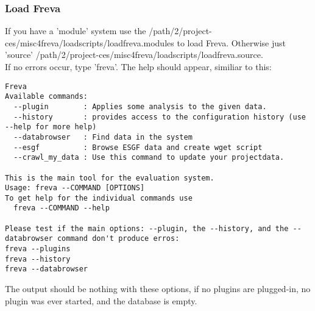 \documentclass[a4paper,11pt]{ltxdoc}
\begin{document}
\subsubsection{Load Freva}
If you have a 'module' system use the /path/2/project-ces/misc4freva/loadscripts/loadfreva.modules to load Freva. Otherwise just 'source' /path/2/project-ces/misc4freva/loadscripts/loadfreva.source. \\
If no errors occur, type 'freva'. The help should appear, similiar to this:
\begin{verbatim}
Freva 
Available commands:
  --plugin        : Applies some analysis to the given data.
  --history       : provides access to the configuration history (use --help for more help)
  --databrowser   : Find data in the system
  --esgf          : Browse ESGF data and create wget script
  --crawl_my_data : Use this command to update your projectdata.

This is the main tool for the evaluation system.
Usage: freva --COMMAND [OPTIONS]
To get help for the individual commands use
  freva --COMMAND --help

Please test if the main options: --plugin, the --history, and the --databrowser command don't produce erros:
freva --plugins
freva --history
freva --databrowser
\end{verbatim}
The output should be nothing with these options, if no plugins are plugged-in, no plugin was ever started, and the database is empty.
\end{document}
